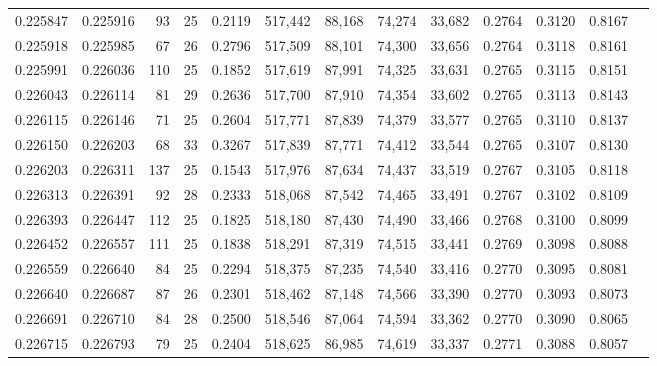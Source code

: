 \begin{tabular}{rrrrrrrrrrrrr}
0.225847 & 0.225916 &  93 &  25 &                                     0.2119 & 517,442 &  88,168 &  74,274 &  33,682 & 0.2764 & 0.3120 & 0.8167 \\
0.225918 & 0.225985 &  67 &  26 &                                     0.2796 & 517,509 &  88,101 &  74,300 &  33,656 & 0.2764 & 0.3118 & 0.8161 \\
0.225991 & 0.226036 & 110 &  25 &                                     0.1852 & 517,619 &  87,991 &  74,325 &  33,631 & 0.2765 & 0.3115 & 0.8151 \\
0.226043 & 0.226114 &  81 &  29 &                                     0.2636 & 517,700 &  87,910 &  74,354 &  33,602 & 0.2765 & 0.3113 & 0.8143 \\
0.226115 & 0.226146 &  71 &  25 &                                     0.2604 & 517,771 &  87,839 &  74,379 &  33,577 & 0.2765 & 0.3110 & 0.8137 \\
0.226150 & 0.226203 &  68 &  33 &                                     0.3267 & 517,839 &  87,771 &  74,412 &  33,544 & 0.2765 & 0.3107 & 0.8130 \\
0.226203 & 0.226311 & 137 &  25 &                                     0.1543 & 517,976 &  87,634 &  74,437 &  33,519 & 0.2767 & 0.3105 & 0.8118 \\
0.226313 & 0.226391 &  92 &  28 &                                     0.2333 & 518,068 &  87,542 &  74,465 &  33,491 & 0.2767 & 0.3102 & 0.8109 \\
0.226393 & 0.226447 & 112 &  25 &                                     0.1825 & 518,180 &  87,430 &  74,490 &  33,466 & 0.2768 & 0.3100 & 0.8099 \\
0.226452 & 0.226557 & 111 &  25 &                                     0.1838 & 518,291 &  87,319 &  74,515 &  33,441 & 0.2769 & 0.3098 & 0.8088 \\
0.226559 & 0.226640 &  84 &  25 &                                     0.2294 & 518,375 &  87,235 &  74,540 &  33,416 & 0.2770 & 0.3095 & 0.8081 \\
0.226640 & 0.226687 &  87 &  26 &                                     0.2301 & 518,462 &  87,148 &  74,566 &  33,390 & 0.2770 & 0.3093 & 0.8073 \\
0.226691 & 0.226710 &  84 &  28 &                                     0.2500 & 518,546 &  87,064 &  74,594 &  33,362 & 0.2770 & 0.3090 & 0.8065 \\
0.226715 & 0.226793 &  79 &  25 &                                     0.2404 & 518,625 &  86,985 &  74,619 &  33,337 & 0.2771 & 0.3088 & 0.8057 \\

\end{tabular}
